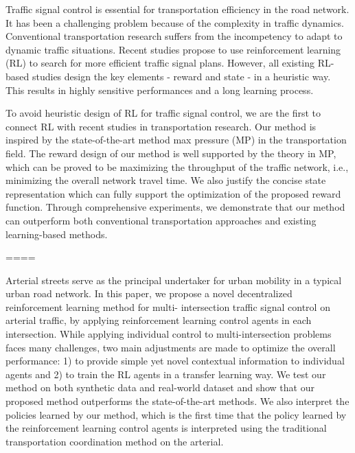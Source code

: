 
\begin{abstract}


\end{abstract}

\begin{englishabstract}
Traffic signal control is essential for transportation efficiency in the road network. It has been a challenging problem because of the complexity in traffic dynamics. Conventional transportation research suffers from the incompetency to adapt to dynamic traffic situations. Recent studies propose to use reinforcement learning (RL) to search for more efficient traffic signal plans. However, all existing RL-based studies design the key elements - reward and state - in a heuristic way. This results in highly sensitive performances and a long learning process.

To avoid heuristic design of RL for traffic signal control, we are the first to connect RL with recent studies in transportation research. Our method is inspired by the state-of-the-art method max pressure (MP) in the transportation field. The reward design of our method is well supported by the theory in MP, which can be proved to be maximizing the throughput of the traffic network, i.e., minimizing the overall network travel time. We also justify the concise state representation which can fully support the optimization of the proposed reward function. Through comprehensive experiments, we demonstrate that our method can outperform both conventional transportation approaches and existing learning-based methods.

====

Arterial streets serve as the principal undertaker for urban mobility in a typical urban road network. In this paper, we propose a novel decentralized reinforcement learning method for multi- intersection traffic signal control on arterial traffic, by applying reinforcement learning control agents in each intersection. While applying individual control to multi-intersection problems faces many challenges, two main adjustments are made to optimize the overall performance: 1) to provide simple yet novel contextual information to individual agents and 2) to train the RL agents in a transfer learning way. We test our method on both synthetic data and real-world dataset and show that our proposed method outperforms the state-of-the-art methods. We also interpret the policies learned by our method, which is the first time that the policy learned by the reinforcement learning control agents is interpreted using the traditional transportation coordination method on the arterial. 


\end{englishabstract}
